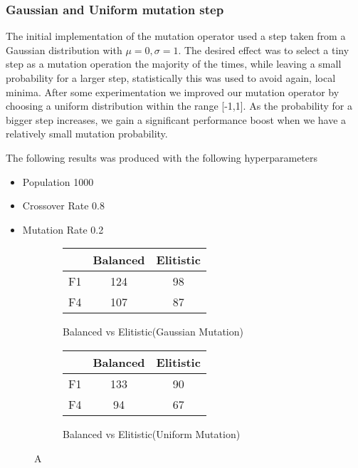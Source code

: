 \documentclass[openany]{article}
\begin{document}
			\subsubsection{Gaussian and Uniform mutation step}
			The initial implementation of the mutation operator used a step taken from a Gaussian distribution with $\mu=0,\sigma=1$. The desired effect was to select a tiny step as a mutation operation the 
			majority of the times, while leaving a small probability for a larger step, statistically this was used to avoid again, local minima. After some experimentation we improved our 
			mutation operator by choosing a uniform distribution within the range [-1,1]. As the probability for a bigger step increases, we gain a significant performance boost when we have a relatively small
			mutation probability.
				\begin{note}
					The following results was produced with the following hyperparameters
					\begin{itemize}
						\item Population 1000
						\item Crossover Rate 0.8
						\item Mutation Rate 0.2
					\end{itemize}
				\end{note}
				\begin{figure}[H]
					\centering
					\begin{subfigure}{.5\textwidth}
						\centering
						\begin{center}
							\begin{tabular}{||c c c||} 
								\hline
								  & Balanced & Elitistic \\ [0.5ex] 
								\hline\hline
								F1 & 124 & 98 \\ 
								\hline
								F4 & 107 & 87 \\
								\hline
							\end{tabular}
						\end{center}
						\caption{Balanced vs Elitistic(Gaussian Mutation)}
						\label{fig:sub1}
					\end{subfigure}%
					\begin{subfigure}{.5\textwidth}
						\centering
						\begin{center}
							\begin{tabular}{||c c c||} 
								\hline
								& Balanced & Elitistic \\ [0.5ex] 
								\hline\hline
								F1 & 133 & 90 \\ 
								\hline
								F4 & 94 & 67 \\
								\hline
							\end{tabular}
						\end{center}
						\caption{Balanced vs Elitistic(Uniform Mutation)}
						\label{fig:sub2}
					\end{subfigure}
					\caption{A}
					\label{fig:test}
				\end{figure}
				
\end{document}
